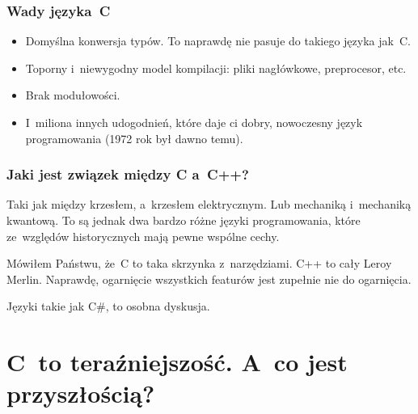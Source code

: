 \documentclass[10pt,t]{beamer}
\begin{document}
\begin{frame}
  \frametitle{Wady języka~C}


  \begin{itemize}

  \item Domyślna konwersja typów. To naprawdę nie pasuje do takiego
    języka jak~C.

  \item Toporny i~niewygodny model kompilacji: pliki nagłówkowe,
    preprocesor, etc.

  \item Brak modułowości.

  \item I~miliona innych udogodnień, które daje ci dobry, nowoczesny język
    programowania (1972 rok był dawno temu).

  \end{itemize}

\end{frame}





\begin{frame}
  \frametitle{Jaki jest związek między C a~C++?}


  Taki jak między krzesłem, a~krzesłem elektrycznym. Lub mechaniką
  i~mechaniką kwantową. To są jednak dwa bardzo różne języki programowania,
  które ze~względów historycznych mają pewne wspólne cechy.

  Mówiłem Państwu, że~C to taka skrzynka z~narzędziami. C++ to cały Leroy
  Merlin. Naprawdę, ogarnięcie wszystkich featurów jest zupełnie nie do
  ogarnięcia.

  Języki takie jak C\#, to osobna dyskusja.

\end{frame}















\section{C~to teraźniejszość. A~co jest przyszłością?}
\end{document}
